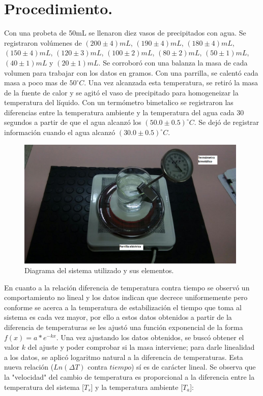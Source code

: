 \documentclass[a4paper]{article}
\begin{document}

\section{Procedimiento.}

Con una probeta de 50mL se llenaron diez vasos de precipitados con agua. Se registraron volúmenes de $(200\pm 4)mL$, $(190\pm4)mL$, $(180\pm4)mL$, $(150\pm4)mL$, $(120\pm3)mL$, $(100\pm2)mL$, $(80\pm2)mL$, $(50\pm1)mL$, $(40\pm1)mL$ y $(20\pm1)mL$. Se corroboró con una balanza la masa de cada volumen para trabajar con los datos en gramos. Con una parrilla, se calentó cada masa a poco mas de $50^{\circ}C$. Una vez alcanzada esta temperatura, se retiró la masa de la fuente de calor y se agitó el vaso de precipitado para homogeneizar la temperatura del líquido. Con un termómetro bimetalico  se registraron las diferencias entre la temperatura ambiente y la temperatura del agua cada 30 segundos a partir de que el agua alcanzó los $(50.0\pm0.5)^{\circ}C$. Se dejó de registrar información cuando el agua alcanzó $(30.0\pm0.5)^{\circ}C$.

\begin{figure}[H]
    \centering
    \includegraphics[width=11cm]{sist-2.png}%
    \caption{Diagrama del sistema utilizado y sus elementos.}%
\end{figure}

En cuanto a la relación diferencia de temperatura contra tiempo se observó un comportamiento no lineal y los datos indican que decrece uniformemente pero conforme se acerca a la temperatura de estabilización el tiempo que toma al sistema es cada vez mayor, por ello a estos datos obtenidos a partir de la diferencia de temperaturas se les ajustó una función exponencial de la forma $f(x)=a*e^{-kx}$. Una vez ajustando los datos obtenidos, se buscó obtener el valor $k$ del ajuste y poder comprobar si la masa interviene; para darle linealidad a los datos, se aplicó logaritmo natural a la diferencia de temperaturas. Esta nueva relación ($Ln(\Delta T)$ contra $tiempo$) sí es de carácter lineal. Se observa que la "velocidad" del cambio de temperatura es proporcional a la diferencia entre la temperatura del sistema [$T_{s}$] y la temperatura ambiente [$T_{a}$]:
\end{document}
